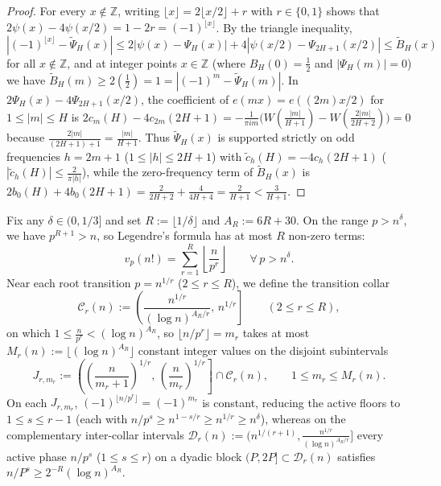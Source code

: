 \documentclass[11pt,reqno]{amsart}
\theoremstyle{remark}
\numberwithin{equation}{section}
\newcommand{\Z}{\mathbb{Z}}
\begin{document}
\begin{proof}
For every $x \notin \Z$, writing $\lfloor x \rfloor = 2\lfloor x/2 \rfloor + r$ with $r \in \{0, 1\}$ shows that $2\psi(x) - 4\psi(x/2) = 1 - 2r = (-1)^{\lfloor x \rfloor}$. By the triangle inequality, $|(-1)^{\lfloor x \rfloor} - \widetilde{\Psi}_H(x)| \le 2|\psi(x) - \Psi_H(x)| + 4|\psi(x/2) - \Psi_{2H+1}(x/2)| \le \widetilde{B}_H(x)$ for all $x \notin \Z$, and at integer points $x \in \Z$ (where $B_H(0) = \frac{1}{2}$ and $|\Psi_H(m)| = 0$) we have $\widetilde{B}_H(m) \ge 2(\frac{1}{2}) = 1 = |(-1)^m - \widetilde{\Psi}_H(m)|$. In $2\Psi_H(x) - 4\Psi_{2H+1}(x/2)$, the coefficient of $e(mx) = e((2m)x/2)$ for $1 \le |m| \le H$ is $2c_m(H) - 4c_{2m}(2H + 1) = -\frac{1}{\pi i m}\bigl(W(\frac{|m|}{H+1}) - W(\frac{2|m|}{2H+2})\bigr) = 0$ because $\frac{2|m|}{(2H+1)+1} = \frac{|m|}{H+1}$. Thus $\widetilde{\Psi}_H(x)$ is supported strictly on odd frequencies $h = 2m + 1$ ($1 \le |h| \le 2H + 1$) with $\tilde{c}_h(H) = -4c_h(2H + 1)$ ($|\tilde{c}_h(H)| \le \frac{2}{\pi |h|}$), while the zero-frequency term of $\widetilde{B}_H(x)$ is $2b_0(H) + 4b_0(2H + 1) = \frac{2}{2H+2} + \frac{4}{4H+4} = \frac{2}{H+1} < \frac{3}{H+1}$.
\end{proof}

Fix any $\delta \in (0, 1/3]$ and set $R := \lfloor 1/\delta \rfloor$ and $A_R := 6R + 30$. On the range $p > n^\delta$, we have $p^{R+1} > n$, so Legendre's formula has at most $R$ non-zero terms:
\begin{equation}\label{eq:2.10}
v_p(n!) = \sum_{r=1}^R \left\lfloor \frac{n}{p^r} \right\rfloor \qquad \forall\, p > n^\delta.
\end{equation}
Near each root transition $p = n^{1/r}$ ($2 \le r \le R$), we define the transition collar
\begin{equation}\label{eq:2.11}
\mathcal{C}_r(n) := \left(\frac{n^{1/r}}{(\log n)^{A_R/r}},\, n^{1/r}\right] \qquad (2 \le r \le R),
\end{equation}
on which $1 \le \frac{n}{p^r} < (\log n)^{A_R}$, so $\lfloor n/p^r \rfloor = m_r$ takes at most $M_r(n) := \lfloor (\log n)^{A_R} \rfloor$ constant integer values on the disjoint subintervals
\begin{equation}\label{eq:2.12}
J_{r,m_r} := \left(\left(\frac{n}{m_r + 1}\right)^{1/r},\, \left(\frac{n}{m_r}\right)^{1/r}\right] \cap \mathcal{C}_r(n), \qquad 1 \le m_r \le M_r(n).
\end{equation}
On each $J_{r,m_r}$, $(-1)^{\lfloor n/p^r \rfloor} = (-1)^{m_r}$ is constant, reducing the active floors to $1 \le s \le r - 1$ (each with $n/p^s \ge n^{1-s/r} \ge n^{1/r} \ge n^\delta$), whereas on the complementary inter-collar intervals $\mathcal{D}_r(n) := \bigl(n^{1/(r+1)}, \frac{n^{1/r}}{(\log n)^{A_R/r}}\bigr]$ every active phase $n/p^s$ ($1 \le s \le r$) on a dyadic block $(P, 2P] \subset \mathcal{D}_r(n)$ satisfies $n/P^s \ge 2^{-R}(\log n)^{A_R}$.
\end{document}
